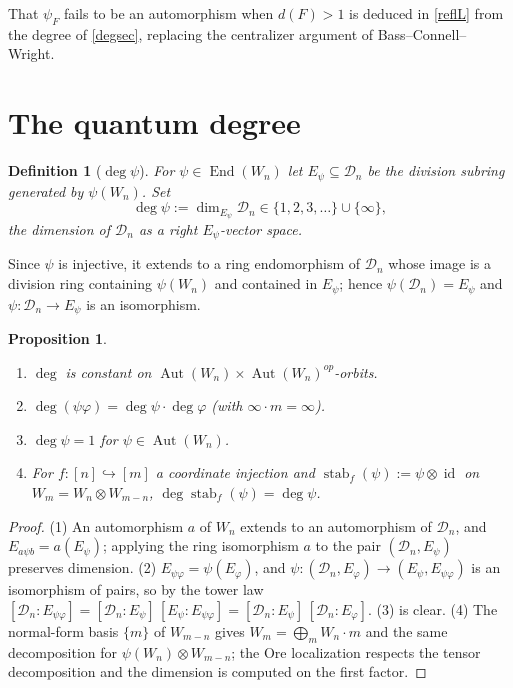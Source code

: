 \documentclass[11pt]{article}
\theoremstyle{change}
\newtheorem{definition}[equation]{Definition}
\newtheorem{prop}[equation]{Proposition}
\theoremstyle{nonumberplain}
\newtheorem{proof}{Proof}
\newcommand\cD{{\mathcal D}}
\newcommand\mono{\hookrightarrow}
\newcommand\setof[1]{\{ #1 \}}
\DeclareMathOperator{\End}{End}
\DeclareMathOperator{\Aut}{Aut}
\DeclareMathOperator{\id}{id}
\DeclareMathOperator{\stab}{stab}
\begin{document}
That $\psi_F$ fails to be an automorphism when $d(F) > 1$ is deduced in \cref{reflL} from the degree of \cref{degsec}, replacing the centralizer argument of Bass--Connell--Wright.

\section{The quantum degree\label{degsec}}

\begin{definition}[$\deg \psi$\label{degdef}]
For $\psi \in \End(W_n)$ let $E_\psi \subseteq \cD_n$ be the division subring generated by $\psi(W_n)$. Set
\begin{equation*}
\deg \psi := \dim_{E_\psi} \cD_n \in \setof{1, 2, 3, \dots} \cup \setof{\infty},
\end{equation*}
the dimension of $\cD_n$ as a right $E_\psi$-vector space.
\end{definition}

Since $\psi$ is injective, it extends to a ring endomorphism of $\cD_n$ whose image is a division ring containing $\psi(W_n)$ and contained in $E_\psi$; hence $\psi(\cD_n) = E_\psi$ and $\psi : \cD_n \to E_\psi$ is an isomorphism.

\begin{prop}\label{degprops}
\begin{enumerate}
\item $\deg$ is constant on $\Aut(W_n) \times \Aut(W_n)^{op}$-orbits.
\item $\deg(\psi \varphi) = \deg \psi \cdot \deg \varphi$ (with $\infty \cdot m = \infty$).
\item $\deg \psi = 1$ for $\psi \in \Aut(W_n)$.
\item For $f : [n] \mono [m]$ a coordinate injection and $\stab_f(\psi) := \psi \otimes \id$ on $W_m = W_n \otimes W_{m-n}$, $\deg \stab_f(\psi) = \deg \psi$.
\end{enumerate}
\end{prop}

\begin{proof}
(1) An automorphism $a$ of $W_n$ extends to an automorphism of $\cD_n$, and $E_{a \psi b} = a(E_\psi)$; applying the ring isomorphism $a$ to the pair $(\cD_n, E_\psi)$ preserves dimension. (2) $E_{\psi\varphi} = \psi(E_\varphi)$, and $\psi : (\cD_n, E_\varphi) \to (E_\psi, E_{\psi\varphi})$ is an isomorphism of pairs, so by the tower law $[\cD_n : E_{\psi\varphi}] = [\cD_n : E_\psi]\,[E_\psi : E_{\psi\varphi}] = [\cD_n : E_\psi]\,[\cD_n : E_\varphi]$. (3) is clear. (4) The normal-form basis $\setof{m}$ of $W_{m-n}$ gives $W_m = \bigoplus_m W_n \cdot m$ and the same decomposition for $\psi(W_n) \otimes W_{m-n}$; the Ore localization respects the tensor decomposition and the dimension is computed on the first factor.
\end{proof}
\end{document}
